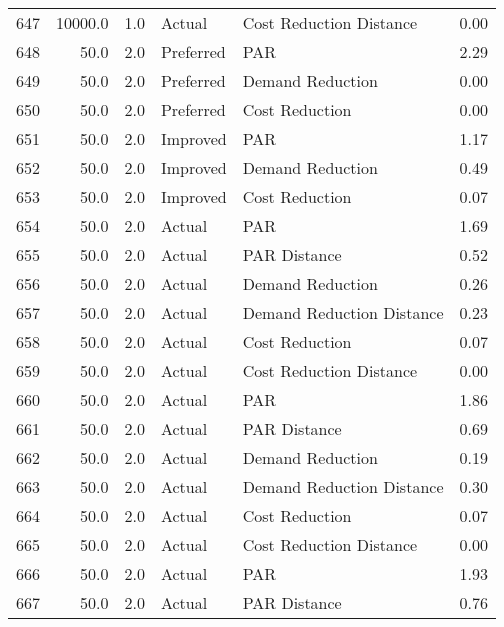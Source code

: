 \begin{longtable}{lrrllr}
647  &      10000.0 &     1.0 &         Actual &    Cost Reduction Distance &   0.00 \\
648  &         50.0 &     2.0 &      Preferred &                        PAR &   2.29 \\
649  &         50.0 &     2.0 &      Preferred &           Demand Reduction &   0.00 \\
650  &         50.0 &     2.0 &      Preferred &             Cost Reduction &   0.00 \\
651  &         50.0 &     2.0 &       Improved &                        PAR &   1.17 \\
652  &         50.0 &     2.0 &       Improved &           Demand Reduction &   0.49 \\
653  &         50.0 &     2.0 &       Improved &             Cost Reduction &   0.07 \\
654  &         50.0 &     2.0 &         Actual &                        PAR &   1.69 \\
655  &         50.0 &     2.0 &         Actual &               PAR Distance &   0.52 \\
656  &         50.0 &     2.0 &         Actual &           Demand Reduction &   0.26 \\
657  &         50.0 &     2.0 &         Actual &  Demand Reduction Distance &   0.23 \\
658  &         50.0 &     2.0 &         Actual &             Cost Reduction &   0.07 \\
659  &         50.0 &     2.0 &         Actual &    Cost Reduction Distance &   0.00 \\
660  &         50.0 &     2.0 &         Actual &                        PAR &   1.86 \\
661  &         50.0 &     2.0 &         Actual &               PAR Distance &   0.69 \\
662  &         50.0 &     2.0 &         Actual &           Demand Reduction &   0.19 \\
663  &         50.0 &     2.0 &         Actual &  Demand Reduction Distance &   0.30 \\
664  &         50.0 &     2.0 &         Actual &             Cost Reduction &   0.07 \\
665  &         50.0 &     2.0 &         Actual &    Cost Reduction Distance &   0.00 \\
666  &         50.0 &     2.0 &         Actual &                        PAR &   1.93 \\
667  &         50.0 &     2.0 &         Actual &               PAR Distance &   0.76 \\

\end{longtable}
